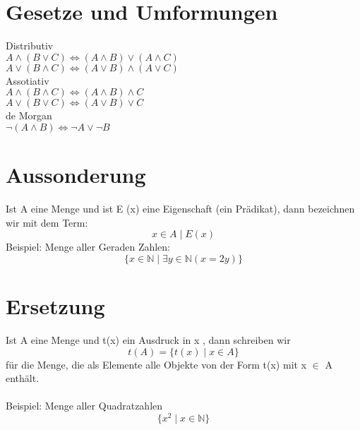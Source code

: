 \section{Gesetze und Umformungen}
Distributiv\\
\(A \wedge (B \vee C) \Leftrightarrow (A \wedge B) \vee (A \wedge C)\)\\
\(A \vee (B \wedge C) \Leftrightarrow (A \vee B) \wedge (A \vee C)\)\\

Assotiativ\\
\(A \wedge (B \wedge C) \Leftrightarrow (A \wedge B) \wedge C\)\\
\(A \vee (B \vee C) \Leftrightarrow (A \vee B) \vee C\)\\

de Morgan\\
\(\neg (A \wedge B) \Leftrightarrow \neg A \vee \neg B\)\\

\section{Aussonderung}
Ist A eine Menge und ist E (x) eine Eigenschaft (ein Prädikat), dann
bezeichnen wir mit dem Term:
\begin{equation}
    x \in A \mid E(x)
\end{equation}
Beispiel: Menge aller Geraden Zahlen:
\begin{equation}
    \{x \in \mathbb{N} \mid \exists{y} \in \mathbb{N}(x= 2y)\}
\end{equation}
\section{Ersetzung}
Ist A eine Menge und t(x) ein Ausdruck in x , dann schreiben wir
\begin{equation}
    t(A) = \{t(x) \mid x \in A\}
\end{equation}
für die Menge, die als Elemente alle Objekte von der Form t(x) mit
x \(\in\) A enthält.\\\\
Beispiel: Menge aller Quadratzahlen
\begin{equation}
    \{x^2 \mid x \in \mathbb{N}\}
\end{equation}


